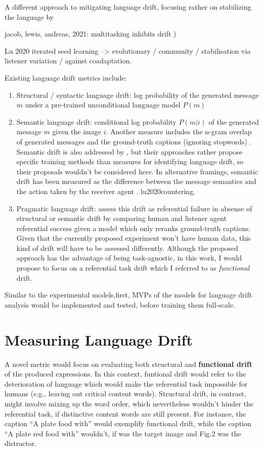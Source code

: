 A different approach to mitigating language drift, focusing rather on stabilizing the language by 

jacob, lewis, andreas, 2021: multitasking inhibits drift )

Lu 2020 iterated seed learning --> evolutionary / community / stabilisation via listener variation / against coadaptation.


Existing language drift metrics include:
\begin{enumerate}
	\item Structural / syntactic language drift: log probability of the generated message $m$ under a pre-trained unconditional language model $P(m)$ \cite{lazaridou2020multi}
	\item Semantic language drift: conditional log probability $P(m|i)$ of the generated message $m$ given the image $i$. Another measure includes the n-gram overlap of generated messages and the ground-truth captions (ignoring stopwords) \cite{lazaridou2020multi}. Semantic drift is also addressed by \cite{lee2019countering}, \parencite{} but their approaches rather propose specific training methods than measures for identifying language drift, so their proposals wouldn't be considered here.
	In alternative framings, semantic drift has been measured as the difference between the message semantics and the action taken by the receiver agent \cite{}. lu2020countering.
	\item Pragmatic language drift: \cite{lazaridou2020multi} assess this drift as referential failure in absense of structural or semantic drift by comparing human and listener agent referential success given a model which only reranks ground-truth captions. Given that the currently proposed experiment won't have human data, this kind of drift will have to be assessed differently. Although the proposed approach has the advantage of being task-agnostic, in this work, I would propose to focus on a referential task drift which I referred to as \textit{functional} drift. 
\end{enumerate}
Similar to the experimental models,first, MVPs of the models for language drift analysis would be implemented and tested, before training them full-scale.



\section{Measuring Language Drift}

A novel metric would focus on evaluating both structural and \textbf{functional drift} of the produced expressions. In this context, funtional drift would refer to the deterioration of language which would make the referential task impossible for humans (e.g., leaving out critical content words). Structural drift, in contrast, might involve mixing up the word order, which nevertheless wouldn't hinder the referential task, if distinctive content words are still present. For instance, the caption ``A plate food with'' would exemplify functional drift, while the caption ``A plate red food with'' wouldn't, if was the target image and Fig.2 was the distractor. 

